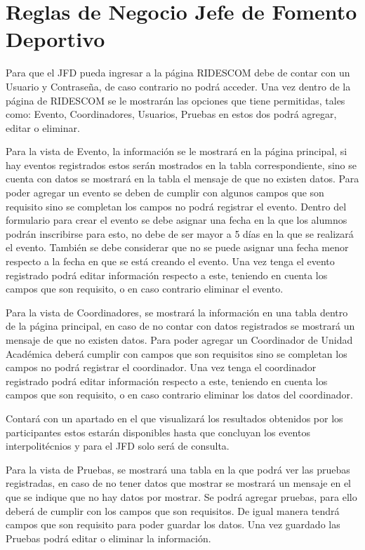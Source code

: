 \section{Reglas de Negocio Jefe de Fomento Deportivo}
Para que el JFD pueda ingresar a la página RIDESCOM debe de contar con un Usuario y Contraseña, de caso contrario no podrá acceder.
Una vez dentro de la página de RIDESCOM se le mostrarán las opciones que tiene permitidas, tales como: Evento, Coordinadores, Usuarios, Pruebas en estos dos podrá agregar, editar o eliminar.

\noindent Para la vista de Evento, la información se le mostrará en la página principal, si hay eventos registrados estos serán mostrados en la tabla correspondiente, sino se cuenta con datos se mostrará en la tabla el mensaje de que no existen datos.  Para poder agregar un evento se deben de cumplir con algunos campos que son requisito sino se completan los campos no podrá registrar el evento.  Dentro del formulario para crear el evento se debe asignar una fecha en la que los alumnos podrán inscribirse para esto, no debe de ser mayor  a 5 días en la que se realizará el evento. También se debe considerar que no se puede asignar una fecha menor respecto a la fecha en que se está creando el evento. Una vez tenga el evento registrado podrá editar información respecto a este, teniendo en cuenta los campos que son requisito, o en caso contrario eliminar el evento.

\noindent Para la vista de Coordinadores, se mostrará la información en una tabla dentro de la página principal, en caso de no contar con datos registrados se mostrará un mensaje de que no existen datos. Para poder agregar un Coordinador de Unidad Académica deberá cumplir con campos que son requisitos sino se completan los campos no podrá registrar el coordinador. Una vez tenga el coordinador registrado podrá editar información respecto a este, teniendo en cuenta los campos que son requisito, o en caso contrario eliminar los datos del coordinador.

\noindent Contará con un apartado en el que visualizará los resultados obtenidos por los participantes estos estarán disponibles hasta que concluyan los eventos interpolitécnios y para el JFD solo será de consulta.

\noindent Para la vista de Pruebas, se mostrará una tabla en la que podrá ver las pruebas registradas, en caso de no tener datos que mostrar se mostrará un mensaje en el que se indique que no hay datos por mostrar. Se podrá agregar pruebas, para ello deberá de cumplir con los campos que son requisitos. De igual manera tendrá campos que son requisito para poder guardar los datos. Una vez guardado las Pruebas podrá editar o eliminar la información.
\pagebreak

